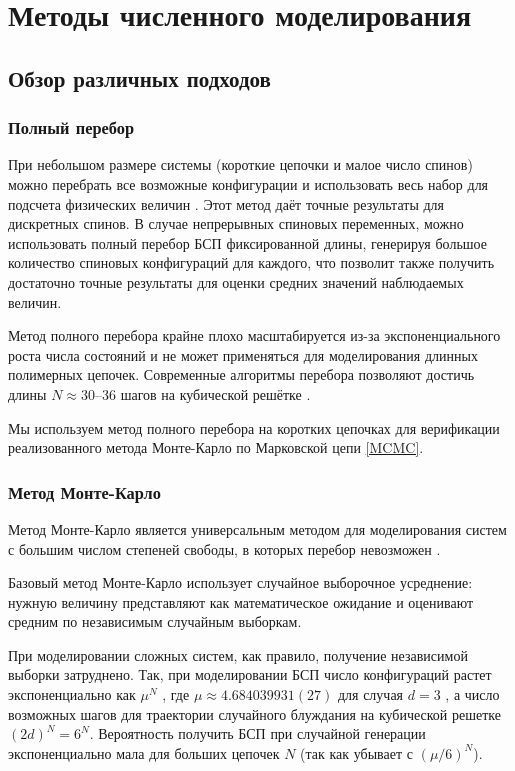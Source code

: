 \chapter{Методы численного моделирования}
\label{ch:methods}


\section{Обзор различных подходов}

 \subsection{Полный перебор} 
 
При небольшом размере системы (короткие цепочки и малое число спинов) можно перебрать все возможные конфигурации и использовать весь набор для подсчета физических величин \cite{Schram_2011}.  Этот метод даёт точные результаты  для дискретных спинов. В случае непрерывных спиновых переменных, можно использовать полный перебор БСП фиксированной длины, генерируя большое количество спиновых конфигураций для каждого, что позволит также получить достаточно точные результаты для оценки средних значений наблюдаемых величин. 

Метод полного перебора крайне плохо масштабируется  из-за экспоненциального роста числа состояний и не может применяться для моделирования длинных полимерных цепочек. Современные алгоритмы перебора позволяют достичь длины $N\approx 30$–36 шагов на кубической решётке \cite{Schram_2011}. 

Мы используем метод полного перебора на коротких цепочках для верификации реализованного метода Монте-Карло по Марковской цепи \ref{MCMC}. 

 
 \subsection{Метод Монте-Карло} 
Метод Монте-Карло является универсальным методом для моделирования систем с большим  числом степеней свободы, в которых перебор невозможен \cite{Landau_Binder_2021, Barkema}.

Базовый метод Монте-Карло использует случайное выборочное усреднение: нужную величину представляют как математическое ожидание и оценивают средним по независимым случайным выборкам.  

При моделировании сложных систем, как правило, получение независимой выборки затруднено.
 Так, при моделировании БСП число конфигураций растет экспоненциально как $\mu^N$ \cite{Rensburg}, где  $\mu \approx  4.684039931(27) $ для случая $d=3$ \cite{clisby2007self},  а число возможных шагов для траектории случайного блуждания на кубической решетке  $(2d)^N = 6^N$. 
 Вероятность получить БСП при случайной генерации 
 экспоненциально мала для больших цепочек $N$  (так как убывает с $(\mu/6)^N$). 
 

